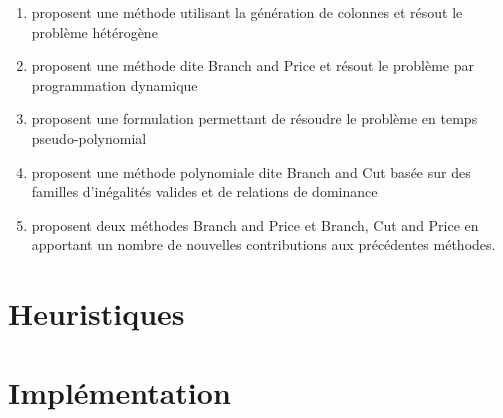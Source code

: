 \documentclass[a4paper]{scrartcl}
\begin{document}
\begin{enumerate}
	\item \cite{butt.ryan_apr1999} proposent une méthode utilisant la génération
		de colonnes et résout le problème hétérogène
	\item \cite{boussier.etal_sep2007} proposent une méthode dite
		\foreignlanguage{UKenglish}{Branch and Price} et résout le
		problème par programmation dynamique
	\item \cite{poggi.etal_2010} proposent une formulation permettant de
		résoudre le problème en temps pseudo-polynomial
	\item \cite{dang.etal_may2013} proposent une méthode polynomiale dite
		\foreignlanguage{UKenglish}{Branch and Cut} basée sur des
		familles d'inégalités valides et de relations de dominance 
	\item \cite{keshtkaran.etal_jan2016} proposent deux méthodes
		\foreignlanguage{UKenglish}{Branch and Price} et
		\foreignlanguage{UKenglish}{Branch, Cut and Price} en apportant
		un nombre de nouvelles contributions aux précédentes méthodes.
\end{enumerate}

\section{Heuristiques}%
\label{sec:heuristiques}

\section{Implémentation}
\label{sec:implementation}

\printnoidxglossary[type=acronym]
\printbibliography
\end{document}
